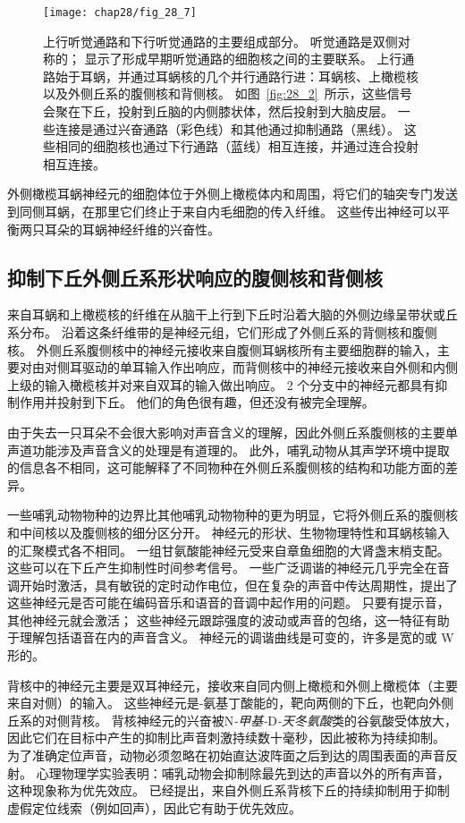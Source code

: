 \begin{figure}[htbp]
	\centering
	\texttt{[image: chap28/fig\_28\_7]}
	\caption{上行听觉通路和下行听觉通路的主要组成部分。
		听觉通路是双侧对称的；
		显示了形成早期听觉通路的细胞核之间的主要联系。
		上行通路始于耳蜗，并通过耳蜗核的几个并行通路行进：耳蜗核、上橄榄核以及外侧丘系的腹侧核和背侧核。
		如图~\ref{fig:28_2}~所示，这些信号会聚在下丘，投射到丘脑的内侧膝状体，然后投射到大脑皮层。
		一些连接是通过兴奋通路（彩色线）和其他通过抑制通路（黑线）。 
		这些相同的细胞核也通过下行通路（蓝线）相互连接，并通过连合投射相互连接。}
	\label{fig:28_7}
\end{figure}


外侧橄榄耳蜗神经元的细胞体位于外侧上橄榄体内和周围，将它们的轴突专门发送到同侧耳蜗，在那里它们终止于来自内毛细胞的传入纤维。
这些传出神经可以平衡两只耳朵的耳蜗神经纤维的兴奋性\cite{darrow2006cochlear}。



\subsection{抑制下丘外侧丘系形状响应的腹侧核和背侧核}

来自耳蜗和上橄榄核的纤维在从脑干上行到下丘时沿着大脑的外侧边缘呈带状或丘系分布。
沿着这条纤维带的是神经元组，它们形成了外侧丘系的背侧核和腹侧核。
外侧丘系腹侧核中的神经元接收来自腹侧耳蜗核所有主要细胞群的输入，主要对由对侧耳驱动的单耳输入作出响应，而背侧核中的神经元接收来自外侧和内侧上级的输入橄榄核并对来自双耳的输入做出响应。
2 个分支中的神经元都具有抑制作用并投射到下丘。
他们的角色很有趣，但还没有被完全理解。


由于失去一只耳朵不会很大影响对声音含义的理解，因此外侧丘系腹侧核的主要单声道功能涉及声音含义的处理是有道理的。
此外，哺乳动物从其声学环境中提取的信息各不相同，这可能解释了不同物种在外侧丘系腹侧核的结构和功能方面的差异。


一些哺乳动物物种的边界比其他哺乳动物物种的更为明显，它将外侧丘系的腹侧核和中间核以及腹侧核的细分区分开。
神经元的形状、生物物理特性和耳蜗核输入的汇聚模式各不相同。
一组甘氨酸能神经元受来自章鱼细胞的大肾盏末梢支配。 
这些可以在下丘产生抑制性时间参考信号。
一些广泛调谐的神经元几乎完全在音调开始时激活，具有敏锐的定时动作电位，但在复杂的声音中传达周期性，提出了这些神经元是否可能在编码音乐和语音的音调中起作用的问题。
只要有提示音，其他神经元就会激活； 
这些神经元跟踪强度的波动或声音的包络，这一特征有助于理解包括语音在内的声音含义。
神经元的调谐曲线是可变的，许多是宽的或 W 形的。


背核中的神经元主要是双耳神经元，接收来自同内侧上橄榄和外侧上橄榄体（主要来自对侧）的输入。
这些神经元是\ce{$\gamma$}-氨基丁酸能的，靶向两侧的下丘，也靶向外侧丘系的对侧背核。
背核神经元的兴奋被N\textit{-甲基-}D\textit{-天冬氨酸}类的谷氨酸受体放大，因此它们在目标中产生的抑制比声音刺激持续数十毫秒，因此被称为持续抑制。
为了准确定位声音，动物必须忽略在初始直达波阵面之后到达的周围表面的声音反射。
心理物理学实验表明：哺乳动物会抑制除最先到达的声音以外的所有声音，这种现象称为优先效应。
已经提出，来自外侧丘系背核下丘的持续抑制用于抑制虚假定位线索（例如回声），因此它有助于优先效应。



